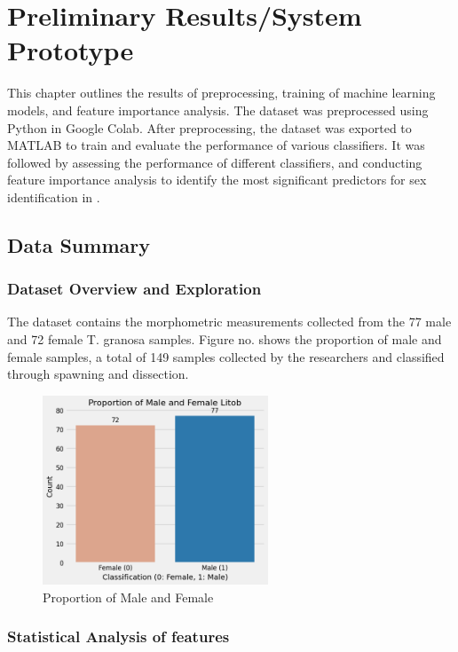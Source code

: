 
\chapter{Preliminary Results/System Prototype}
This chapter outlines the results of preprocessing, training of machine learning models, and feature importance analysis. The dataset was preprocessed using Python in Google Colab. After preprocessing, the dataset was exported to MATLAB to train and evaluate the performance of various classifiers. It was followed by assessing the performance of different classifiers, and conducting feature importance analysis to identify the most significant predictors for sex identification in \Tgranosa.

\section{Data Summary}
\subsection{Dataset Overview and Exploration}

The dataset contains the morphometric measurements collected from the 77 male and 72 female T. granosa samples. Figure no. shows the proportion of male and female samples, a total of 149 samples collected by the researchers and classified through spawning and dissection. 

\begin{figure}[!htbp]
	\centering
	\includegraphics[width=0.6\textwidth]{figures/test-train.png}
	\caption{Proportion of Male and Female \Tgranosa}
	\label{fig:test-train}
\end{figure}

\subsection{Statistical Analysis of \Tgranosa features}

